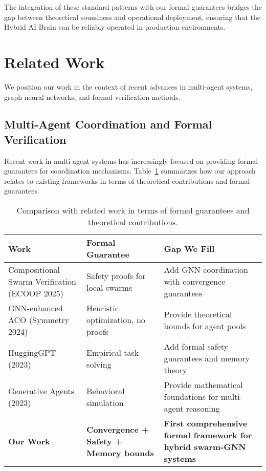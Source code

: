 \documentclass{article}
\begin{document}
The integration of these standard patterns with our formal guarantees bridges the gap between theoretical soundness and operational deployment, ensuring that the Hybrid AI Brain can be reliably operated in production environments.

\section{Related Work}
\label{sec:related_work}

We position our work in the context of recent advances in multi-agent systems, graph neural networks, and formal verification methods.

\subsection{Multi-Agent Coordination and Formal Verification}

Recent work in multi-agent systems has increasingly focused on providing formal guarantees for coordination mechanisms. Table~\ref{tab:related_work} summarizes how our approach relates to existing frameworks in terms of theoretical contributions and formal guarantees.

\begin{table}[h]
\centering
\footnotesize
\renewcommand{\arraystretch}{1.4}
\begin{tabular}{|p{2.5cm}|p{2.8cm}|p{4.5cm}|}
\hline
\textbf{Work} & \textbf{Formal Guarantee} & \textbf{Gap We Fill} \\
\hline
Compositional Swarm Verification (ECOOP 2025) & 
Safety proofs for local swarms & 
Add GNN coordination with convergence guarantees \\
\hline
GNN-enhanced ACO (Symmetry 2024) & 
Heuristic optimization, no proofs & 
Provide theoretical bounds for agent pools \\
\hline
HuggingGPT (2023) & 
Empirical task solving & 
Add formal safety guarantees and memory theory \\
\hline
Generative Agents (2023) & 
Behavioral simulation & 
Provide mathematical foundations for multi-agent reasoning \\
\hline
\textbf{Our Work} & 
\textbf{Convergence + Safety + Memory bounds} & 
\textbf{First comprehensive formal framework for hybrid swarm-GNN systems} \\
\hline
\end{tabular}
\caption{Comparison with related work in terms of formal guarantees and theoretical contributions.}
\label{tab:related_work}
\end{table}
\end{document}
